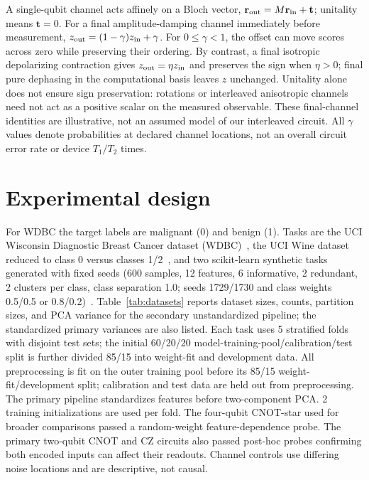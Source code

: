 \documentclass[conference]{IEEEtran}
\begin{document}
A single-qubit channel acts affinely on a Bloch vector, $\mathbf r_{\rm out}=M\mathbf r_{\rm in}+\mathbf t$; unitality means $\mathbf t=0$. For a final amplitude-damping channel immediately before measurement, $z_{\rm out}=(1-\gamma)z_{\rm in}+\gamma$. For $0\leq\gamma<1$, the offset can move scores across zero while preserving their ordering. By contrast, a final isotropic depolarizing contraction gives $z_{\rm out}=\eta z_{\rm in}$ and preserves the sign when $\eta>0$; final pure dephasing in the computational basis leaves $z$ unchanged. Unitality alone does not ensure sign preservation: rotations or interleaved anisotropic channels need not act as a positive scalar on the measured observable. These final-channel identities are illustrative, not an assumed model of our interleaved circuit. All $\gamma$ values denote probabilities at declared channel locations, not an overall circuit error rate or device $T_1/T_2$ times.

\section{Experimental design}
For WDBC the target labels are malignant (0) and benign (1). Tasks are the UCI Wisconsin Diagnostic Breast Cancer dataset (WDBC)~\cite{wdbc}, the UCI Wine dataset reduced to class 0 versus classes 1/2~\cite{wine}, and two scikit-learn synthetic tasks generated with fixed seeds (600 samples, 12 features, 6 informative, 2 redundant, 2 clusters per class, class separation 1.0; seeds 1729/1730 and class weights 0.5/0.5 or 0.8/0.2)~\cite{sklearn}. Table~\ref{tab:datasets} reports dataset sizes, counts, partition sizes, and PCA variance for the secondary unstandardized pipeline; the standardized primary variances are also listed. Each task uses 5 stratified folds with disjoint test sets; the initial 60/20/20 model-training-pool/calibration/test split is further divided 85/15 into weight-fit and development data. All preprocessing is fit on the outer training pool before its 85/15 weight-fit/development split; calibration and test data are held out from preprocessing. The primary pipeline standardizes features before two-component PCA. 2 training initializations are used per fold. The four-qubit CNOT-star used for broader comparisons passed a random-weight feature-dependence probe. The primary two-qubit CNOT and CZ circuits also passed post-hoc probes confirming both encoded inputs can affect their readouts. Channel controls use differing noise locations and are descriptive, not causal.
\end{document}
